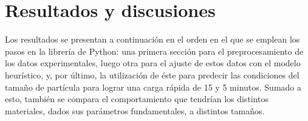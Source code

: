 \section{Resultados y discusiones}

Los resultados se presentan a continuación en el orden en el que se emplean 
los pasos en la librería  de Python: una primera sección
para el preprocesamiento de los datos experimentales, luego otra para el ajuste
de estos datos con el modelo heurístico, y, por último, la utilización de éste
para predecir las condiciones del tamaño de partícula para lograr una carga
rápida de 15 y 5 minutos. Sumado a esto, también se compara el comportamiento que
tendrían los distintos materiales, dados sus parámetros fundamentales, a 
distintos tamaños.








